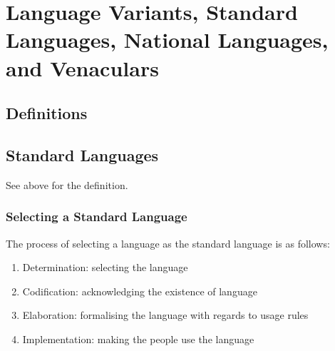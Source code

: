 \documentclass[../main.tex]{subfiles}
\begin{document}
\section{Language Variants, Standard Languages, National Languages, and Venaculars}

    \subsection{Definitions}


    \subsection{Standard Languages}
    See above for the definition.

        \subsubsection{Selecting a Standard Language}
        The process of selecting a language as the standard language is as follows:
        \begin{enumerate}
            \item Determination: selecting the language
            \item Codification: acknowledging the existence of language
            \item Elaboration: formalising the language with regards to usage rules
            \item Implementation: making the people use the language
        \end{enumerate}
\end{document}
